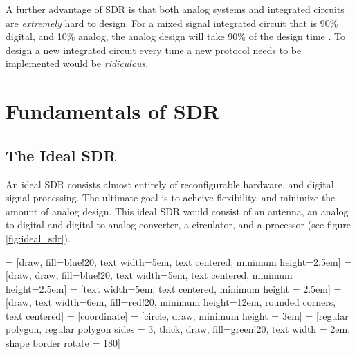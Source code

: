 \documentclass[a4paper, 12pt]{article}
\begin{document}
A further advantage of SDR is that both analog systems and integrated circuits are \textit{extremely} hard to design.  For a mixed signal integrated circuit that is 90\% digital, and 10\% analog, the analog design will take 90\% of the design time \cite{ana_why}.  To design a new integrated circuit every time a new protocol needs to be implemented would be \textit{ridiculous}.


\section{Fundamentals of SDR}
\label{sec:sdr_funadamentals}
\subsection{The Ideal SDR}
\label{sec:ideal_sdr}
An ideal SDR consists almost entirely of reconfigurable hardware, and digital signal processing. The ultimate goal is to acheive flexibility, and minimize the amount of analog design.  This ideal SDR would consist of an antenna, an analog to digital and digital to analog converter, a circulator, and a processor (see figure \ref{fig:ideal_sdr}).


 = [draw, fill=blue!20, text width=5em, 
    text centered, minimum height=2.5em]
 = [draw, draw, fill=blue!20, text width=5em, 
    text centered, minimum height=2.5em]
 = [text width=5em, text centered, minimum height = 2.5em]
 = [draw, text width=6em, fill=red!20, 
    minimum height=12em, rounded corners, text centered]
 = [coordinate]
 = [circle, draw, minimum height = 3em]
 = [regular polygon, regular polygon sides = 3, thick, draw, fill=green!20, text width = 2em, shape border rotate = 180]


\def\blockdist{2.3}
\def\edgedist{2.5}
\end{document}
